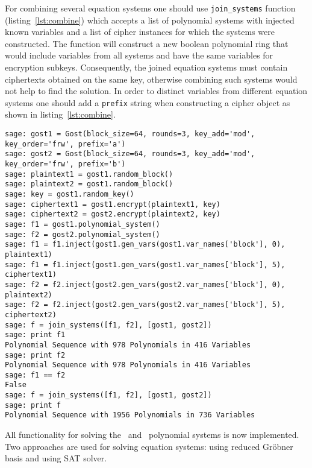 For combining several equation systems one should use \verb+join_systems+
function (listing~\ref{lst:combine}) which accepts a list of polynomial systems
with injected known variables and a list of cipher instances for which the
systems were constructed. The function will construct a new boolean polynomial
ring that would include variables from all systems and have the same variables
for encryption subkeys. Consequently, the joined equation systems must contain ciphertexts
obtained on the same key, otherwise combining such systems would not help to
find the solution. In order to distinct variables from different equation systems
one should add a \verb+prefix+ string when constructing a cipher object as
shown in listing~\ref{lst:combine}.
\begin{lstlisting}[label=lst:combine, caption=Combining several equation systems]
sage: gost1 = Gost(block_size=64, rounds=3, key_add='mod', key_order='frw', prefix='a')
sage: gost2 = Gost(block_size=64, rounds=3, key_add='mod', key_order='frw', prefix='b')
sage: plaintext1 = gost1.random_block()                                                
sage: plaintext2 = gost1.random_block()                                                
sage: key = gost1.random_key()                                                         
sage: ciphertext1 = gost1.encrypt(plaintext1, key)                                     
sage: ciphertext2 = gost2.encrypt(plaintext2, key)                                     
sage: f1 = gost1.polynomial_system()                                                   
sage: f2 = gost2.polynomial_system()
sage: f1 = f1.inject(gost1.gen_vars(gost1.var_names['block'], 0), plaintext1)          
sage: f1 = f1.inject(gost1.gen_vars(gost1.var_names['block'], 5), ciphertext1)
sage: f2 = f2.inject(gost2.gen_vars(gost2.var_names['block'], 0), plaintext2) 
sage: f2 = f2.inject(gost2.gen_vars(gost2.var_names['block'], 5), ciphertext2)
sage: f = join_systems([f1, f2], [gost1, gost2])
sage: print f1
Polynomial Sequence with 978 Polynomials in 416 Variables
sage: print f2
Polynomial Sequence with 978 Polynomials in 416 Variables
sage: f1 == f2
False
sage: f = join_systems([f1, f2], [gost1, gost2])                                               
sage: print f
Polynomial Sequence with 1956 Polynomials in 736 Variables
\end{lstlisting}


All functionality for solving the \gost\ and \misty\  polynomial systems is now
implemented.  Two approaches are used for solving equation systems: using
reduced Gr\"obner basis and using SAT solver. 

